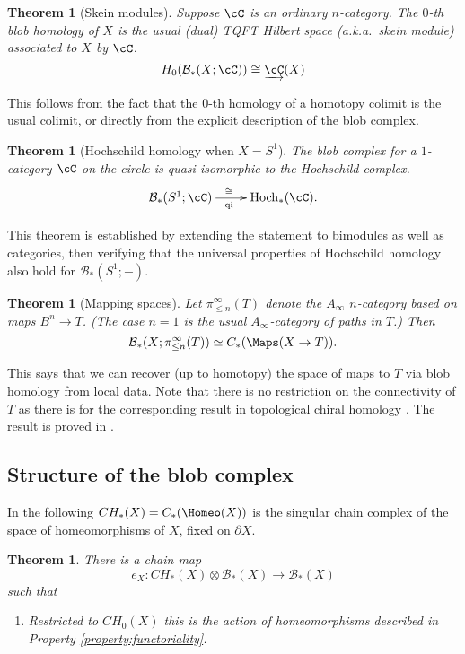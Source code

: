 \documentclass{pnastwo}
\def\bc{{\mathcal B}}
\newcommand{\HC}{\operatorname{Hoch}}
\newcommand{\CM}[2]{C_*(\Maps(#1 \to #2))}
\newcommand{\CH}[1]{CH_*(#1)}
\newcommand{\cl}[1]{\underrightarrow{#1}}
\newcommand{\iso}{\cong}
\newcommand{\tensor}{\otimes}
\newcommand{\bdy}{\partial}
\newtheorem{thm}[prop]{Theorem}
\begin{document}
\begin{article}
\begin{thm}[Skein modules]
\label{thm:skein-modules}
Suppose $\cC$ is an ordinary $n$-category.
The $0$-th blob homology of $X$ is the usual 
(dual) TQFT Hilbert space (a.k.a.\ skein module) associated to $X$
by $\cC$.
\begin{equation*}
H_0(\bc_*(X;\cC)) \iso \cl{\cC}(X)
\end{equation*}
\end{thm}
This follows from the fact that the $0$-th homology of a homotopy colimit is the usual colimit, 
or directly from the explicit description of the blob complex.

\begin{thm}[Hochschild homology when $X=S^1$]
\label{thm:hochschild}
The blob complex for a $1$-category $\cC$ on the circle is
quasi-isomorphic to the Hochschild complex.
\begin{equation*}
\xymatrix{\bc_*(S^1;\cC) \ar[r]^(0.47){\iso}_(0.47){\text{qi}} & \HC_*(\cC).}
\end{equation*}
\end{thm}
This theorem is established by extending the statement to bimodules as well as categories, 
then verifying that the universal properties of Hochschild homology also hold for $\bc_*(S^1; -)$.

\begin{thm}[Mapping spaces]
\label{thm:map-recon}
Let $\pi^\infty_{\le n}(T)$ denote the $A_\infty$ $n$-category based on maps 
$B^n \to T$.
(The case $n=1$ is the usual $A_\infty$-category of paths in $T$.)
Then 
$$\bc_*(X; \pi^\infty_{\le n}(T)) \simeq \CM{X}{T}.$$
\end{thm}

This says that we can recover (up to homotopy) the space of maps to $T$ via blob homology from local data. 
Note that there is no restriction on the connectivity of $T$ as there is for 
the corresponding result in topological chiral homology \cite[Theorem 3.8.6]{0911.0018}. 
The result is proved in \cite[\S 7.3]{1009.5025}.

\subsection{Structure of the blob complex}
\label{sec:structure}

In the following $\CH{X} = C_*(\Homeo(X))$ is the singular chain complex of the space 
of homeomorphisms of $X$, fixed on $\bdy X$.

\begin{thm}
\label{thm:CH}\label{thm:evaluation}
There is a chain map
\begin{equation*}
e_X: \CH{X} \tensor \bc_*(X) \to \bc_*(X)
\end{equation*}
such that
\begin{enumerate}
\item Restricted to $CH_0(X)$ this is the action of homeomorphisms described in Property \ref{property:functoriality}. 


\end{enumerate}
\end{thm}
\end{article}
\end{document}

